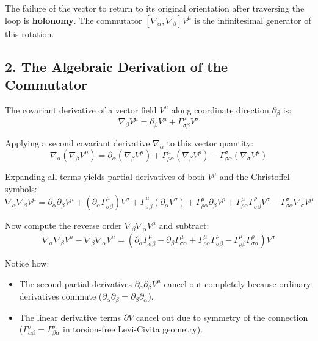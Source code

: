\documentclass[11pt,a4paper]{article}
\begin{document}
	The failure of the vector to return to its original orientation after traversing the loop is \textbf{holonomy}. The commutator $[\nabla_\alpha, \nabla_\beta] V^\mu$ is the infinitesimal generator of this rotation.
	
	\subsection{2. The Algebraic Derivation of the Commutator}
	
	The covariant derivative of a vector field $V^\mu$ along coordinate direction $\partial_\beta$ is:
	\begin{equation}
		\nabla_\beta V^\mu = \partial_\beta V^\mu + \Gamma_{\sigma\beta}^\mu V^\sigma
	\end{equation}
	
	Applying a second covariant derivative $\nabla_\alpha$ to this vector quantity:
	\begin{equation}
		\nabla_\alpha (\nabla_\beta V^\mu) = \partial_\alpha(\nabla_\beta V^\mu) + \Gamma_{\rho\alpha}^\mu (\nabla_\beta V^\rho) - \Gamma_{\beta\alpha}^\sigma (\nabla_\sigma V^\mu)
	\end{equation}
	
	Expanding all terms yields partial derivatives of both $V^\mu$ and the Christoffel symbols:
	\begin{equation}
		\nabla_\alpha \nabla_\beta V^\mu = \partial_\alpha \partial_\beta V^\mu + (\partial_\alpha \Gamma_{\sigma\beta}^\mu) V^\sigma + \Gamma_{\sigma\beta}^\mu (\partial_\alpha V^\sigma) + \Gamma_{\rho\alpha}^\mu \partial_\beta V^\rho + \Gamma_{\rho\alpha}^\mu \Gamma_{\sigma\beta}^\rho V^\sigma - \Gamma_{\beta\alpha}^\sigma \nabla_\sigma V^\mu
	\end{equation}
	
	Now compute the reverse order $\nabla_\beta \nabla_\alpha V^\mu$ and subtract:
	\begin{equation}
		\nabla_\alpha \nabla_\beta V^\mu - \nabla_\beta \nabla_\alpha V^\mu = \left( \partial_\alpha \Gamma_{\sigma\beta}^\mu - \partial_\beta \Gamma_{\sigma\alpha}^\mu + \Gamma_{\rho\alpha}^\mu \Gamma_{\sigma\beta}^\rho - \Gamma_{\rho\beta}^\mu \Gamma_{\sigma\alpha}^\rho \right) V^\sigma
	\end{equation}
	
	Notice how:
	\begin{itemize}
		\item The second partial derivatives $\partial_\alpha \partial_\beta V^\mu$ cancel out completely because ordinary derivatives commute ($\partial_\alpha \partial_\beta = \partial_\beta \partial_\alpha$).
		\item The linear derivative terms $\partial V$ cancel out due to symmetry of the connection ($\Gamma_{\alpha\beta}^\sigma = \Gamma_{\beta\alpha}^\sigma$ in torsion-free Levi-Civita geometry).
	\end{itemize}
	
\end{document}
